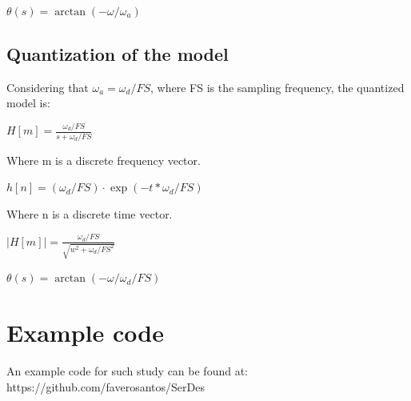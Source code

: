 \documentclass{article}
\begin{document}
\begin{question}
\centerline{$ \theta(s) = \arctan{(- \omega / \omega_{a})}
	$}
\end{question}

\subsection{Quantization of the model}

Considering that $\omega_{a} = \omega_{d} / FS$, where FS is the sampling frequency, the quantized model is:

\begin{question}
	\centerline{$ H[m] = \frac{\omega_{d} / FS}{s + \omega_{d} / FS}
		$}
\end{question}
Where m is a discrete frequency vector.

\begin{question}
	\centerline{$ h[n] = (\omega_{d} / FS) \cdot \exp(-t * \omega_{d} / FS)
		$}
\end{question}
Where n is a discrete time vector.

\begin{question}
	\centerline{$ |H[m]| = \frac{\omega_{d} / FS}{\sqrt{w^2 + \omega_{d} / FS^2}}
		$}
\end{question}

\begin{question}
	\centerline{$ \theta(s) = \arctan{(- \omega / \omega_{d} / FS)}
		$}
\end{question}

\section{Example code}

An example code for such study can be found at: https://github.com/faverosantos/SerDes


\begin{thebibliography}{9}
	
	
	
\end{thebibliography}
\end{document}
